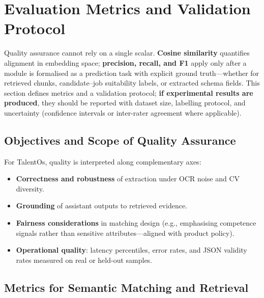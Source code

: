 \section{Evaluation Metrics and Validation Protocol}
\label{sec:ch4:evaluation}

Quality assurance cannot rely on a single scalar. \textbf{Cosine similarity} quantifies alignment in embedding space; \textbf{precision, recall, and F1} apply only after a module is formalised as a prediction task with explicit ground truth—whether for retrieved chunks, candidate--job suitability labels, or extracted schema fields. This section defines metrics and a validation protocol; \textbf{if experimental results are produced}, they should be reported with dataset size, labelling protocol, and uncertainty (confidence intervals or inter-rater agreement where applicable).

\subsection{Objectives and Scope of Quality Assurance}
\label{sec:ch4:qa_scope}

For TalentOs, quality is interpreted along complementary axes:

\begin{itemize}
    \item \textbf{Correctness and robustness} of extraction under OCR noise and CV diversity.
    \item \textbf{Grounding} of assistant outputs to retrieved evidence.
    \item \textbf{Fairness considerations} in matching design (e.g., emphasising competence signals rather than sensitive attributes—aligned with product policy).
    \item \textbf{Operational quality}: latency percentiles, error rates, and JSON validity rates measured on real or held-out samples.
\end{itemize}

\subsection{Metrics for Semantic Matching and Retrieval}
\label{sec:ch4:metrics_matching_retrieval}

